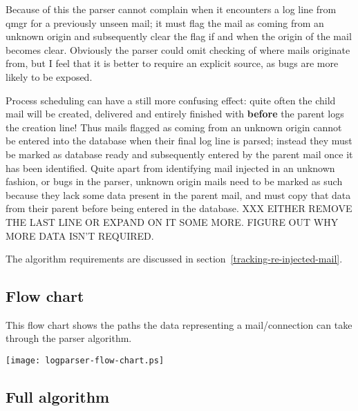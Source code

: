 \documentclass[a4paper,12pt,draft]{article}
\begin{document}
\begin{enumerate}
        Because of this the parser cannot complain when it encounters a log
        line from qmgr for a previously unseen mail; it must flag the mail
        as coming from an unknown origin and subsequently clear the flag if and
        when the origin of the mail becomes clear.  Obviously the parser
        could omit checking of where mails originate from, but I feel that
        it is better to require an explicit source, as bugs are more likely
        to be exposed.

        Process scheduling can have a still more confusing effect: quite
        often the child mail will be created, delivered and entirely
        finished with \textbf{before} the parent logs the creation line!
        Thus mails flagged as coming from an unknown origin cannot be
        entered into the database when their final log line is parsed;
        instead they must be marked as database ready and subsequently
        entered by the parent mail once it has been identified.  Quite
        apart from identifying mail injected in an unknown fashion, or bugs
        in the parser, unknown origin mails need to be marked as such
        because they lack some data present in the parent mail, and must
        copy that data from their parent before being entered in the
        database.  XXX EITHER REMOVE THE LAST LINE OR EXPAND ON IT SOME
        MORE\@.  FIGURE OUT WHY MORE DATA ISN'T REQUIRED\@.

        The algorithm requirements are discussed in
        section~\ref{tracking-re-injected-mail}.


\end{enumerate}

\newpage
\subsection{Flow chart}

\label{flow-chart}

This flow chart shows the paths the data representing a mail/connection can
take through the parser algorithm.

\texttt{[image: logparser-flow-chart.ps]}

\subsection{Full algorithm}

\label{full-algorithm}
\end{document}
